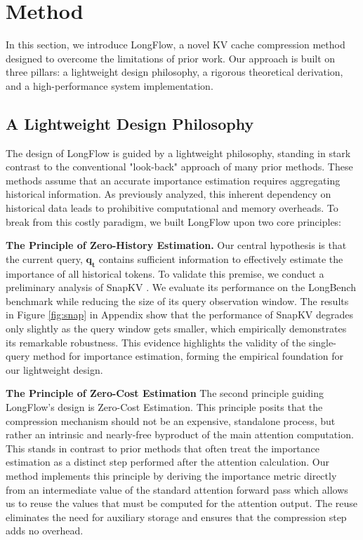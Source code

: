 \section{Method}

In this section, we introduce LongFlow, a novel KV cache compression method designed to overcome the limitations of prior work. Our approach is built on three pillars: a lightweight design philosophy, a rigorous theoretical derivation, and a high-performance system implementation.

\subsection{A Lightweight Design Philosophy}
The design of LongFlow is guided by a lightweight philosophy, standing in stark contrast to the conventional "look-back" approach of many prior methods. These methods assume that an accurate importance estimation requires aggregating historical information. As previously analyzed, this inherent dependency on historical data leads to prohibitive computational and memory overheads.
To break from this costly paradigm, we built LongFlow upon two core principles:



\noindent\textbf{The Principle of Zero-History Estimation.}
Our central hypothesis is that the current query, $\mathbf{q_t}$ contains sufficient information to effectively estimate the importance of all historical tokens.
To validate this premise, we conduct a preliminary analysis of SnapKV \citep{snapkv}.
We evaluate its performance on the LongBench benchmark \citep{longbench} while reducing the size of its query observation window. The results in Figure \ref{fig:snap} in Appendix show that the performance of SnapKV degrades only slightly as the query window gets smaller, which empirically demonstrates its remarkable robustness.
This evidence highlights the validity of the single-query method for importance estimation, forming the empirical foundation for our lightweight design.


\noindent\textbf{The Principle of Zero-Cost Estimation}
The second principle guiding LongFlow's design is Zero-Cost Estimation. This principle posits that the compression mechanism should not be an expensive, standalone process, but rather an intrinsic and nearly-free byproduct of the main attention computation. This stands in contrast to prior methods that often treat the importance estimation as a distinct step performed after the attention calculation.
Our method implements this principle by deriving the importance metric directly from an intermediate value of the standard attention forward pass which allows us to reuse the values that must be computed for the attention output. 
The reuse eliminates the need for auxiliary storage and ensures that the compression step adds no overhead.



